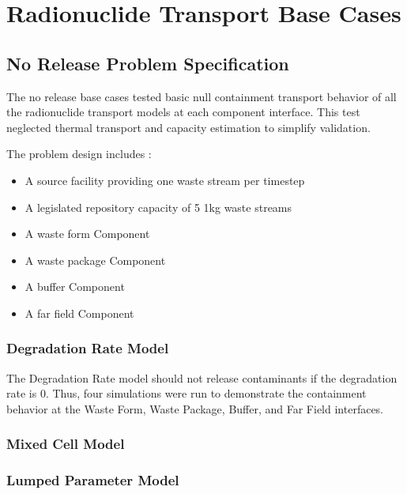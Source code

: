 \section{Radionuclide Transport Base Cases}\label{sec:nuclide_base_cases}
\subsection{No Release Problem Specification}
The no release base cases tested basic null containment transport behavior of 
all the radionuclide transport models at each component interface. This test 
neglected thermal transport and capacity estimation to simplify validation. 

The problem design includes : 
\begin{itemize}
\item{A source facility providing one waste stream per timestep}
\item{A legislated repository capacity of 5 1kg waste streams}
\item{A waste form Component} 
\item{A waste package Component}
\item{A buffer Component}
\item{A far field Component}
\end{itemize}

\subsubsection{Degradation Rate Model}
The Degradation Rate model should not release contaminants if the degradation 
rate is 0. Thus, four simulations were run to demonstrate the containment 
behavior at the Waste Form, Waste Package, Buffer, and Far Field interfaces. 



\subsubsection{Mixed Cell Model}



\subsubsection{Lumped Parameter Model}



